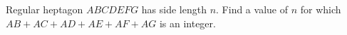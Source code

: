 Regular heptagon $ABCDEFG$ has side length $n$. Find a value of $n$ for which $AB+AC+AD+AE+AF+AG$ is an integer.
